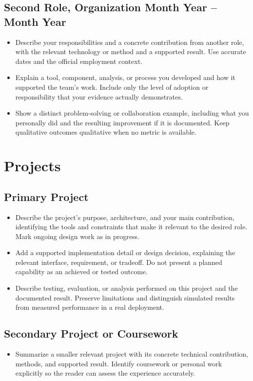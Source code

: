 \documentclass[letterpaper,10pt]{article}
\begin{document}
\subsection*{Second Role, Organization \hfill Month Year -- Month Year}
\begin{itemize}
\item Describe your responsibilities and a concrete contribution from another role, with the relevant technology or method and a supported result. Use accurate dates and the official employment context.
\item Explain a tool, component, analysis, or process you developed and how it supported the team's work. Include only the level of adoption or responsibility that your evidence actually demonstrates.
\item Show a distinct problem-solving or collaboration example, including what you personally did and the resulting improvement if it is documented. Keep qualitative outcomes qualitative when no metric is available.
\end{itemize}
\section*{Projects}
\subsection*{Primary Project}
\begin{itemize}
\item Describe the project's purpose, architecture, and your main contribution, identifying the tools and constraints that make it relevant to the desired role. Mark ongoing design work as in progress.
\item Add a supported implementation detail or design decision, explaining the relevant interface, requirement, or tradeoff. Do not present a planned capability as an achieved or tested outcome.
\item Describe testing, evaluation, or analysis performed on this project and the documented result. Preserve limitations and distinguish simulated results from measured performance in a real deployment.
\end{itemize}
\subsection*{Secondary Project or Coursework}
\begin{itemize}
\item Summarize a smaller relevant project with its concrete technical contribution, methods, and supported result. Identify coursework or personal work explicitly so the reader can assess the experience accurately.
\end{itemize}
\end{document}
